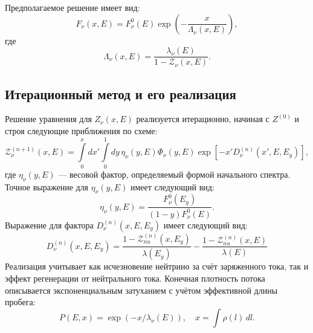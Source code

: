 Предполагаемое решение имеет вид:
\begin{equation}
F_{\nu}(x,E) = F^{0}_{\nu}(E)\exp\left(-\frac{x}{\Lambda_{\nu}(x,E)}\right),
\end{equation}
где 
\begin{equation}
\Lambda_{\nu}(x,E) = \frac{\lambda_{\nu}(E)}{1 - \mathcal{Z}_{\nu}(x,E)}.
\end{equation}

\subsection{Итерационный метод и его реализация}

Решение уравнения для $Z_{\nu}(x,E)$ реализуется итерационно, начиная с $Z^{(0)}$ и строя следующие приближения по схеме:
\begin{equation}
\mathcal{Z}^{(n+1)}_{\nu}(x,E) = \int\limits_0^x dx' \int\limits_0^1 dy\,\eta_{\nu}(y,E)\Phi_{\nu}(y,E)\exp\left[ -x'D^{(n)}_{\nu}(x',E,E_y) \right],
\end{equation}
где $\eta_{\nu}(y,E)$ — весовой фактор, определяемый формой начального спектра. Точное выражение для $\eta_{\nu}(y,E)$ имеет следующий вид: 
\begin{equation}
    \eta_{\nu}(y,E) = \frac{F^0_{\nu}(E_y)}{(1-y)F^0_{\nu}(E)}.
\end{equation}
Выражение для фактора $D^{(n)}_{\nu}(x, E, E_y)$ имеет следующий вид:
\begin{equation}
    D^{(n)}_{\nu}(x, E, E_y) = \frac{1-\mathcal{Z}_{nu}^{(n)}(x, E_y)}{\lambda(E_y)} - \frac{1-\mathcal{Z}_{nu}^{(n)}(x, E)}{\lambda(E)}
\end{equation}
Реализация учитывает как исчезновение нейтрино за счёт заряженного тока, так и эффект регенерации от нейтрального тока. Конечная плотность потока описывается экспоненциальным затуханием с учётом эффективной длины пробега:
\begin{equation}
P(E,x) = \exp(-x/\lambda_{\nu}(E)), \quad x = \int\rho(l)\,dl.
\end{equation}
